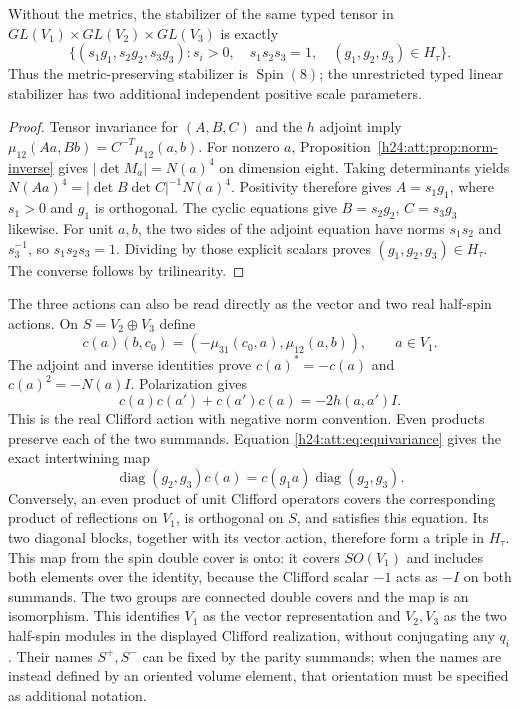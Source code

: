 \begin{proposition}\label{h24:att:prop:linear-stabilizer}
Without the metrics, the stabilizer of the same typed tensor in
$GL(V_1)\times GL(V_2)\times GL(V_3)$ is exactly
\[
 \{(s_1g_1,s_2g_2,s_3g_3):s_i>0,\quad s_1s_2s_3=1,\quad
                          (g_1,g_2,g_3)\in H_\tau\}.
\]
Thus the metric-preserving stabilizer is $\operatorname{Spin}(8)$;
the unrestricted typed linear stabilizer has two additional
independent positive scale parameters.
\end{proposition}

\begin{proof}
Tensor invariance for $(A,B,C)$ and the $h$ adjoint imply
$\mu_{12}(Aa,Bb)=C^{-T}\mu_{12}(a,b)$.
For nonzero $a$, Proposition~\ref{h24:att:prop:norm-inverse} gives
$|\det M_a|=N(a)^4$ on dimension eight. Taking determinants yields
$N(Aa)^4=|\det B\det C|^{-1}N(a)^4$. Positivity therefore gives
$A=s_1g_1$, where $s_1>0$ and $g_1$ is orthogonal. The cyclic equations
give $B=s_2g_2$, $C=s_3g_3$ likewise. For unit $a,b$, the two sides
of the adjoint equation have norms $s_1s_2$ and $s_3^{-1}$, so
$s_1s_2s_3=1$. Dividing by those explicit scalars proves
$(g_1,g_2,g_3)\in H_\tau$. The converse follows by trilinearity.
\end{proof}

The three actions can also be read directly as the vector and two
real half-spin actions. On $S=V_2\oplus V_3$ define
\begin{equation}
 c(a)(b,c_0)=(-\mu_{31}(c_0,a),\mu_{12}(a,b)),\qquad a\in V_1.
 \label{h24:att:eq:clifford}
\end{equation}
The adjoint and inverse identities prove
$c(a)^*=-c(a)$ and $c(a)^2=-N(a)I$. Polarization gives
\[
 c(a)c(a')+c(a')c(a)=-2h(a,a')I.
\]
This is the real Clifford action with negative norm convention.
Even products preserve each of the two summands.
Equation \eqref{h24:att:eq:equivariance} gives the exact intertwining map
\[
 \operatorname{diag}(g_2,g_3)c(a)
 =c(g_1a)\operatorname{diag}(g_2,g_3).
\]
Conversely, an even product of unit Clifford operators covers the
corresponding product of reflections on $V_1$, is orthogonal on $S$,
and satisfies this equation. Its two diagonal blocks, together with
its vector action, therefore form a triple in $H_\tau$. This map
from the spin double cover is onto: it covers $SO(V_1)$ and includes
both elements over the identity, because the Clifford scalar $-1$
acts as $-I$ on both summands. The two groups are connected double
covers and the map is an isomorphism. This identifies $V_1$ as the
vector representation and $V_2,V_3$ as the two half-spin modules in
the displayed Clifford realization, without conjugating any $q_i$.
Their names $S^+,S^-$ can be fixed by the parity summands; when the
names are instead defined by an oriented volume element, that
orientation must be specified as additional notation.

